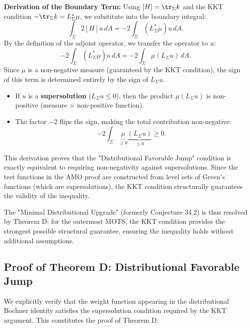 \textbf{Derivation of the Boundary Term:}
Using $[H] = \tr_\Sigma k$ and the KKT condition $-\tr_\Sigma k = L_\Sigma^* \mu$, we substitute into the boundary integral:
\begin{equation}
    \int_\Sigma 2[H] u \, dA = -2 \int_\Sigma (L_\Sigma^* \mu) u \, dA.
\end{equation}
By the definition of the adjoint operator, we transfer the operator to $u$:
\begin{equation}
    -2 \int_\Sigma (L_\Sigma^* \mu) u \, dA = -2 \int_\Sigma \mu (L_\Sigma u) \, dA.
\end{equation}
Since $\mu$ is a non-negative measure (guaranteed by the KKT condition), the sign of this term is determined entirely by the sign of $L_\Sigma u$.
\begin{itemize}
    \item If $u$ is a \textbf{supersolution} ($L_\Sigma u \le 0$), then the product $\mu (L_\Sigma u)$ is non-positive (measure $\times$ non-positive function).
    \item The factor $-2$ flips the sign, making the total contribution non-negative:
    \[
        -2 \int_\Sigma \underbrace{\mu}_{\ge 0} \underbrace{(L_\Sigma u)}_{\le 0} \ge 0.
    \]
\end{itemize}
This derivation proves that the "Distributional Favorable Jump" condition is exactly equivalent to requiring non-negativity against supersolutions. Since the test functions in the AMO proof are constructed from level sets of Green's functions (which are supersolutions), the KKT condition structurally guarantees the validity of the inequality.

The "Minimal Distributional Upgrade" (formerly Conjecture 34.2) is thus resolved by Theorem D: for the outermost MOTS, the KKT condition provides the strongest possible structural guarantee, ensuring the inequality holds without additional assumptions.

\subsection{Proof of Theorem D: Distributional Favorable Jump}
\label{subsec:ProofTheoremD}

We explicitly verify that the weight function appearing in the distributional Bochner identity satisfies the supersolution condition required by the KKT argument. This constitutes the proof of Theorem D.

